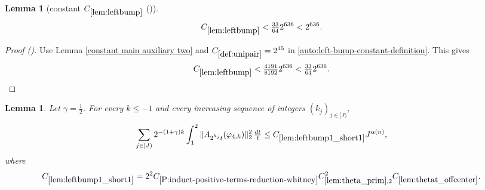 \documentclass[12pt,reqno]{amsart}
\newcommand{\auto}{{({\tiny\faCar})}}
\theoremstyle{plain}
\newtheorem{lemma}[theorem]{Lemma}
\numberwithin{equation}{section}
\theoremstyle{remark}
\newcommand{\uses}[1]{}
\newcommand{\usesdefs}[1]{}
\begin{document}
\begin{lemma}[constant $C_{\ref{lem:leftbump}}$ \auto]\label{constant left bump}\uses{constant main auxiliary two,lem:leftbump}\usesdefs{def:unipair}
\begin{equation}\label{constant left bump bound}
C_{\ref{lem:leftbump}}<\tfrac{33}{64}2^{636}<2^{636}.
\end{equation}
\end{lemma}
\begin{proof}[Proof \auto]
Use Lemma \ref{constant main auxiliary two} and $C_{\ref{def:unipair}}=2^{15}$ in \eqref{auto:left-bump-constant-definition}. This gives
\[
C_{\ref{lem:leftbump}}
<\tfrac{4191}{8192}2^{636}
<\tfrac{33}{64}2^{636}.
\]
\end{proof}

\begin{lemma}\label{lem:leftbump1_short1}\uses{A to Lambda,lem:theta_prim,lem:thetat_offcenter,P:induct-positive-terms-reduction-whitney,lem:int_fct,lem:phi4_supp}\usesdefs{A_def,bracket bump,normalized function tuples,auto:prism-form-definition,defn:window based bump functions}
Let $\gamma=\frac12$. For every $k\le-1$ and every increasing sequence of integers $(k_j)_{j\in[J)}$,
\begin{equation}\label{auto:left-bump-one-short-one-bound}
\sum_{j\in[J)}2^{-(1+\gamma)k}\int_1^2
\|A_{2^{k_j}t}(\varphi_{4,k})\|_2^2\,\tfrac{dt}{t}
\le C_{\ref{lem:leftbump1_short1}}J^{\alpha(n)},
\end{equation}
where
\begin{equation}\label{auto:left-bump-one-short-one-constant-definition}
C_{\ref{lem:leftbump1_short1}}
=2^2C_{\ref{P:induct-positive-terms-reduction-whitney}}
C_{\ref{lem:theta_prim},2}^2C_{\ref{lem:thetat_offcenter}}.
\end{equation}
\end{lemma}
\end{document}
